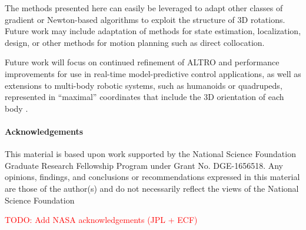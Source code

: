 \documentclass[letterpaper, 10 pt, conference]{ieeeconf}  %
\newcommand{\todo}[1]{\textcolor{red}{TODO: #1}}
\begin{document}
    The methods presented here can easily be leveraged to adapt other classes
    of gradient or Newton-based algorithms to exploit the structure of 3D rotations. Future
    work may include adaptation of methods for state estimation, localization, design, or 
    other methods for motion planning such as direct collocation. 
    
    Future work will focus on continued 
    refinement of ALTRO and performance improvements for use in real-time model-predictive control applications, as well as extensions to multi-body robotic
    systems, such as humanoids or quadrupeds, represented in
    ``maximal'' coordinates that include the 3D orientation of each body \cite{brudigam2020linear}. 

\paragraph*{Acknowledgements}
This material is based upon work supported by the National Science Foundation Graduate
Research Fellowship Program under Grant No. DGE-1656518. Any opinions, findings, and
conclusions or recommendations expressed in this material are those of the author(s) and
do not necessarily reflect the views of the National Science Foundation

\todo{Add NASA acknowledgements (JPL + ECF)}


\printbibliography
\end{document}
